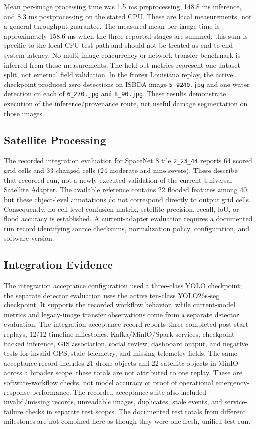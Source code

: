 \documentclass[conference]{IEEEtran}
\newcommand{\changed}[1]{{\color{blue}#1}}
\newcommand{\changed}[1]{#1}
\begin{document}
Mean per-image processing time was 1.5 ms preprocessing, 148.8 ms inference, and 8.3 ms postprocessing on the stated CPU. These are local measurements, not a general throughput guarantee. The measured mean per-image time is approximately 158.6 ms when the three reported stages are summed; this sum is specific to the local CPU test path and should not be treated as end-to-end system latency. No multi-image concurrency or network transfer benchmark is inferred from these measurements. The held-out metrics represent one dataset split, not external field validation. In the frozen Louisiana replay, the active checkpoint produced zero detections on ISBDA image \texttt{5\_9240.jpg} and one water detection on each of \texttt{6\_270.jpg} and \texttt{8\_90.jpg}. These results demonstrate execution of the inference/provenance route, not useful damage segmentation on those images.

\subsection{Satellite Processing}
\changed{The recorded integration evaluation for SpaceNet 8 tile \texttt{2\_23\_44} reports 64 scored grid cells and 33 changed cells (24 moderate and nine severe). These describe that recorded run, not a newly executed validation of the current Universal Satellite Adapter. The available reference contains 22 flooded features among 40, but these object-level annotations do not correspond directly to output grid cells. Consequently, no cell-level confusion matrix, satellite precision, recall, IoU, or flood accuracy is established. A current-adapter evaluation requires a documented run record identifying source checksums, normalization policy, configuration, and software version.}

\subsection{Integration Evidence}
\changed{The integration acceptance configuration used a three-class YOLO checkpoint; the separate detector evaluation uses the active ten-class YOLO26s-seg checkpoint. It supports the recorded workflow behavior, while current-model metrics and legacy-image transfer observations come from a separate detector evaluation.} The integration acceptance record reports three completed post-start replays, 12/12 timeline milestones, Kafka/MinIO/Spark services, checkpoint-backed inference, GIS association, social review, dashboard output, and negative tests for invalid GPS, stale telemetry, and missing telemetry fields. The same acceptance record includes 21 drone objects and 22 satellite objects in MinIO across a broader scope; these totals are not attributed to one replay. These are software-workflow checks, not model accuracy or proof of operational emergency-response performance. The recorded acceptance suite also included invalid/missing records, unreadable images, duplicates, stale events, and service-failure checks in separate test scopes. The documented test totals from different milestones are not combined here as though they were one fresh, unified test run.
\end{document}
